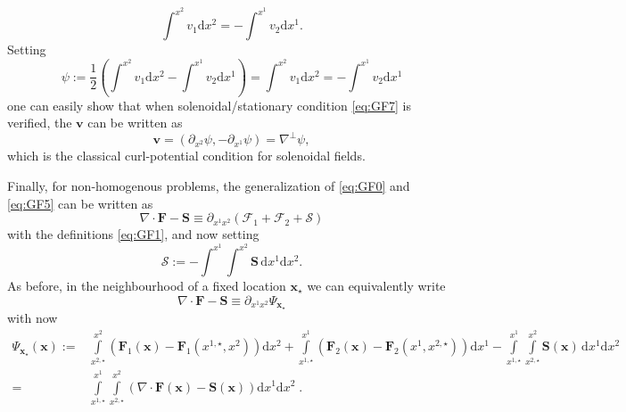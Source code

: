 \documentclass[a4paper,10pt]{article}
\begin{document}
    \begin{equation}\label{eq:GF7}
\int^{x^2} v_1 \mathrm{d}x^2 =-  \int^{x^1} v_2 \mathrm{d}x^1.
        \end{equation}
Setting 
$$
\psi := \dfrac{1}{2}\left( \int^{x^2} v_1 \mathrm{d}x^2 -  \int^{x^1} v_2 \mathrm{d}x^1 \right) =\int^{x^2} v_1 \mathrm{d}x^2 =-  \int^{x^1} v_2 \mathrm{d}x^1
$$
one can easily show that when solenoidal/stationary  condition \eqref{eq:GF7} is verified, the  
$  \mathbf{v}$ can be written as 
\begin{equation}\label{eq:GF8}
  \mathbf{v} = ( \partial_{x^2}\psi, -\partial_{x^1}\psi) = \nabla^{\perp} \psi,
\end{equation}
which is the classical curl-potential condition for solenoidal fields. 

Finally, for non-homogenous problems, the generalization of \eqref{eq:GF0}  and \eqref{eq:GF5} can be written as 
    \begin{equation}\label{eq:GF9}
    \nabla\cdot  \mathbf{F}  - \mathbf{S} \equiv   \partial_{x^1x^2} (\mathcal{F}_1 + \mathcal{F}_2 + \mathcal{S})  
  \end{equation}
  with the definitions \eqref{eq:GF1}, and now setting
      \begin{equation}\label{eq:GF10}
      \mathcal{S} :=- \int^{x^1}\int^{x^2} \mathbf{S}\,\mathrm{d}x^1 \mathrm{d}x^2 .
        \end{equation}
As before, in the neighbourhood of a fixed location $\mathbf{x}_\star$ we can equivalently write 
      \begin{equation}\label{eq:GF11}
           \nabla\cdot  \mathbf{F}  - \mathbf{S}  \equiv  \partial_{x^1x^2}\Psi_{\mathbf{x}_\star}
        \end{equation}
        with now
          \begin{equation}\label{eq:GF12}
          \begin{aligned}
      \Psi_{\mathbf{x}_\star}(\mathbf{x})  := &
  \int\limits_{x^{2,\star}}^{x^2} \left( \mathbf{F}_1(\mathbf{x}) -\mathbf{F}_1(x^{1,\star},x^2) \right) \mathrm{d}x^2  +
  \int\limits_{x^{1,\star}}^{x^1} \left( \mathbf{F}_2(\mathbf{x}) -\mathbf{F}_2(x^1,x^{2,\star}) \right)   \mathrm{d}x^1-  \int\limits_{x^{1,\star}}^{x^1}  \int\limits_{x^{2,\star}}^{x^2}\mathbf{S}(\mathbf{x})\,\mathrm{d}x^1 \mathrm{d}x^2\\
  =   &\int\limits_{x^{1,\star}}^{x^1}  \int\limits_{x^{2,\star}}^{x^2} (\nabla\cdot  \mathbf{F}(\mathbf{x}) - \mathbf{S}(\mathbf{x}))\mathrm{d}x^1 \mathrm{d}x^2 \;.
  \end{aligned}
  \end{equation}
\end{document}
